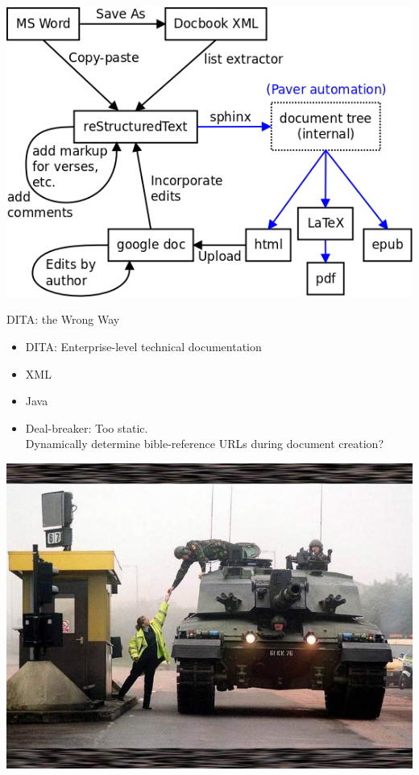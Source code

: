 \documentclass{beamer}
\begin{document}
\begin{frame}
    \includegraphics[keepaspectratio=true, width=\paperwidth]{theorest_process.png}
\end{frame}
    
    \begin{frame}{DITA: the Wrong Way}
        \begin{itemize}
        \item DITA: Enterprise-level technical documentation
        \item XML
        \item Java
        \item Deal-breaker: Too static.\\
            Dynamically determine bible-reference URLs during document creation?
        \end{itemize}
    \end{frame}
    
    \begin{frame}[plain]
        \centerline{\includegraphics[keepaspectratio=true, width=\paperwidth]{tank-toll.jpg}}
    \end{frame}
    
\end{document}
